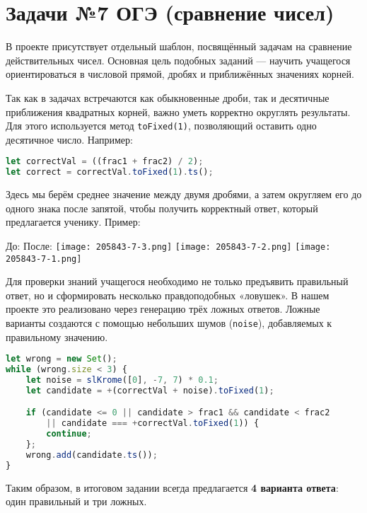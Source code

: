 \section{Задачи №7 ОГЭ (сравнение чисел)}
В проекте присутствует отдельный шаблон, посвящённый задачам на сравнение действительных чисел. 
Основная цель подобных заданий --- научить учащегося ориентироваться в числовой прямой, дробях и приближённых значениях корней.  

Так как в задачах встречаются как обыкновенные дроби, так и десятичные приближения квадратных корней, 
важно уметь корректно округлять результаты. Для этого используется метод \verb|toFixed(1)|, позволяющий оставить одно десятичное число. Например:

\begin{lstlisting}[language=JavaScript]
let correctVal = ((frac1 + frac2) / 2);
let correct = correctVal.toFixed(1).ts();
\end{lstlisting}
Здесь мы берём среднее значение между двумя дробями, а затем округляем его до одного знака после запятой, 
чтобы получить корректный ответ, который предлагается ученику.  
Пример:
 
До:
После:
\texttt{[image: 205843-7-3.png]}
\texttt{[image: 205843-7-2.png]}
\texttt{[image: 205843-7-1.png]}

Для проверки знаний учащегося необходимо не только предъявить правильный ответ, 
но и сформировать несколько правдоподобных «ловушек». 
В нашем проекте это реализовано через генерацию трёх ложных ответов. 
Ложные варианты создаются с помощью небольших шумов (\verb|noise|), добавляемых к правильному значению.  

\begin{lstlisting}[language=JavaScript]
let wrong = new Set();
while (wrong.size < 3) {
    let noise = slKrome([0], -7, 7) * 0.1;
    let candidate = +(correctVal + noise).toFixed(1);

    if (candidate <= 0 || candidate > frac1 && candidate < frac2 
        || candidate === +correctVal.toFixed(1)) {
        continue;
    };
    wrong.add(candidate.ts());
}
\end{lstlisting}

Таким образом, в итоговом задании всегда предлагается \textbf{4 варианта ответа}: один правильный и три ложных.  

